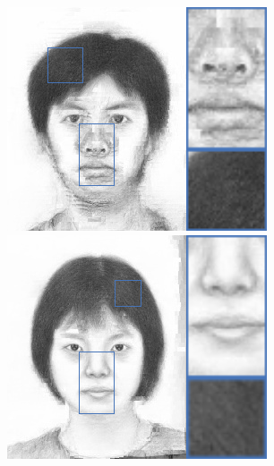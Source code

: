 \documentclass[10pt,twocolumn,letterpaper]{article}
\begin{document}
\begin{figure}[htbp]
{\begin{minipage}[b]{0.13\linewidth}
\includegraphics[width=0.99\linewidth]{img/sketch_result/mwf_s1.png}
\includegraphics[width=0.99\linewidth]{img/sketch_result/mwf_s2.png}

\end{minipage}}
\end{figure}
\end{document}
